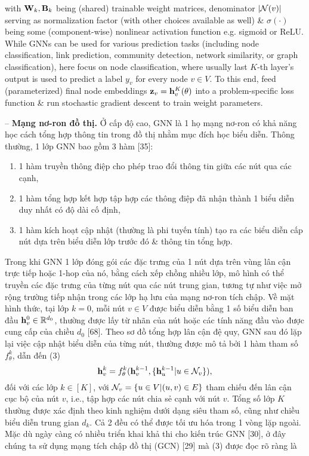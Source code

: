 \documentclass{article}
\begin{document}
\begin{itemize}
    with ${\bf W}_k,{\bf B}_k$ being (shared) trainable weight matrices, denominator $|{\cal N}(v)|$ serving as normalization factor (with other choices available as well) \& $\sigma(\cdot)$ being some (component-wise) nonlinear activation function e.g. sigmoid or ReLU. While GNNs can be used for various prediction tasks (including node classification, link prediction, community detection, network similarity, or graph classification), here focus on node classification, where usually last $K$-th layer's output is used to predict a label $y_v$ for every node $v\in V$. To this end, feed (parameterized) final node embeddings ${\bf z}_v = {\bf h}_v^K(\theta)$ into a problem-specific loss function \& run stochastic gradient descent to train weight parameters.

    -- {\bf Mạng nơ-ron đồ thị.} Ở cấp độ cao, GNN là 1 họ mạng nơ-ron có khả năng học cách tổng hợp thông tin trong đồ thị nhằm mục đích học biểu diễn. Thông thường, 1 lớp GNN bao gồm 3 hàm [35]:
    \begin{enumerate}
        \item 1 hàm truyền thông điệp cho phép trao đổi thông tin giữa các nút qua các cạnh,
        \item 1 hàm tổng hợp kết hợp tập hợp các thông điệp đã nhận thành 1 biểu diễn duy nhất có độ dài cố định,
        \item 1 hàm kích hoạt cập nhật (thường là phi tuyến tính) tạo ra các biểu diễn cấp nút dựa trên biểu diễn lớp trước đó \& thông tin tổng hợp.
    \end{enumerate}
    Trong khi GNN 1 lớp đóng gói các đặc trưng của 1 nút dựa trên vùng lân cận trực tiếp hoặc 1-hop của nó, bằng cách xếp chồng nhiều lớp, mô hình có thể truyền các đặc trưng của từng nút qua các nút trung gian, tương tự như việc mở rộng trường tiếp nhận trong các lớp hạ lưu của mạng nơ-ron tích chập. Về mặt hình thức, tại lớp $k = 0$, mỗi nút $v\in V$ được biểu diễn bằng 1 số biểu diễn ban đầu ${\bf h}_v^0\in\mathbb{R}^{d_0}$, thường được lấy từ nhãn của nút hoặc các tính năng đầu vào được cung cấp của chiều $d_0$ [68]. Theo sơ đồ tổng hợp lân cận đệ quy, GNN sau đó lặp lại việc cập nhật biểu diễn của từng nút, thường được mô tả bởi 1 hàm tham số $f_\theta^k$, dẫn đến (3)
    \begin{equation*}
        {\bf h}_v^k = f_\theta^k({\bf h}_v^{k-1},\{{\bf h}_u^{k-1}|u\in{\cal N}_v\}),
    \end{equation*}
    đối với các lớp $k\in[K]$, với ${\cal N}_v = \{u\in V|(u,v)\in E\}$ tham chiếu đến lân cận cục bộ của nút $v$, i.e., tập hợp các nút chia sẻ cạnh với nút $v$. Tổng số lớp $K$ thường được xác định theo kinh nghiệm dưới dạng siêu tham số, cũng như chiều biểu diễn trung gian $d_k$. Cả 2 đều có thể được tối ưu hóa trong 1 vòng lặp ngoài. Mặc dù ngày càng có nhiều triển khai khả thi cho kiến trúc GNN [30], ở đây chúng ta sử dụng mạng tích chập đồ thị (GCN) [29] mà (3) được đọc rõ ràng là

\end{itemize}
\end{document}

